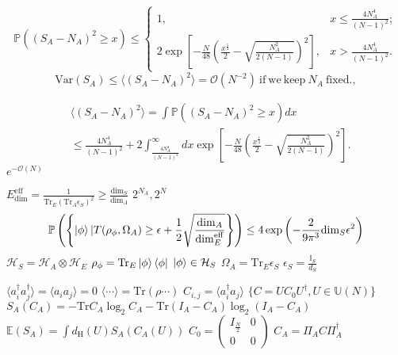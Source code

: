 \documentclass{beamer}
\begin{document}
\begin{frame}
   \[
\mathbb{P}((S_{A}-N_{A})^{2}\geq x)\leq\begin{cases}
1, & x\leq\frac{4N_{A}^{4}}{(N-1)^{2}};\\
2\exp\left[-\frac{N}{48}\left(\frac{x^{\frac{1}{4}}}{2}-\sqrt{\frac{N_{A}^{2}}{2(N-1)}}\right)^{2}\right], & x>\frac{4N_{A}^{4}}{(N-1)^{2}}.
\end{cases}
\]
\[
\mathrm{Var}(S_{A})\leq\langle(S_{A}-N_{A})^{2}\rangle=\mathcal{O}(N^{-2})\ \mathrm{if\ we\ keep}\ N_{A}\ \mathrm{fixed}.,
\]
\end{frame}
\begin{frame}
   \begin{align*}
&\langle(S_{A}-N_{A})^{2}\rangle =\int\mathbb{P}((S_{A}-N_{A})^{2}\geq x)dx\\
 & \leq\frac{4N_{A}^{4}}{(N-1)^{2}}+2\int_{\frac{4N_{A}^{4}}{(N-1)^{2}}}^{\infty}dx\exp\left[-\frac{N}{48}\left(\frac{x^{\frac{1}{4}}}{2}-\sqrt{\frac{N_{A}^{2}}{2(N-1)}}\right)^{2}\right].
\end{align*}
$e^{-\mathcal{O}(N)}$
\end{frame}
\begin{frame}
   $E_\mathrm{dim}^{\mathrm{eff}}=\frac{1}{\mathrm{Tr}_{E}(\mathrm{Tr}_{A}\epsilon_{S})^{2}}\geq\frac{\mathrm{dim}_{S}}{\mathrm{dim}_{A}}$
   $2^{N_A}, 2^N$
   \begin{equation*}
   \mathbb{P}\left(\left\{ \ket{\phi}|T(\rho_{\phi},\Omega_{A})\geq\epsilon+\frac{1}{2}\sqrt{\frac{\mathrm{dim}_{A}}{\mathrm{dim}_{E}^{\mathrm{eff}}}}\right\} \right)\leq4\exp{\left(-\frac{2}{9\pi^{3}}\mathrm{dim}_{S}\epsilon^{2}\right)}
   \end{equation*}
   $\mathcal{H}_S=\mathcal{H}_A\otimes\mathcal{H}_E$
   $\rho_{\phi}=\mathrm{Tr}_E\ket{\phi}\bra{\phi}$
   $\ket{\phi}\in\mathcal{H}_S$
   $\Omega_{A}=\mathrm{Tr}_E\epsilon_S$
   $\epsilon_S=\frac{\mathbb{I}_S}{d_S}$
\end{frame}
\begin{frame}
   $\langle a_{i}^{\dagger}a_{j}^{\dagger}\rangle=\langle a_{i}a_{j}\rangle=0$
    $\langle\cdots\rangle=\mathrm{Tr}(\rho\cdots)$
    $C_{i,j}=\langle a_i^\dag a_{j}\rangle$
    $\{C=UC_{0}U^{\dagger},U\in\mathbb{U}(N)\}$
    $S_{A}(C_{A})=-\mathrm{Tr} C_{A}\log_{2}C_{A}-\mathrm{Tr}(I_{A}-C_{A})\log_{2}(I_{A}-C_{A})$
    $\mathbb{E}(S_{A})=\int d_{\mathrm{H}}(U)S_{A}(C_{A}(U))$
$C_{0}=\begin{pmatrix}I_{\frac{N}{2}} & 0\\
0 & 0
\end{pmatrix}$
$C_{A}=\Pi_A C \Pi_A^{\dagger}$
\end{frame}
\end{document}
